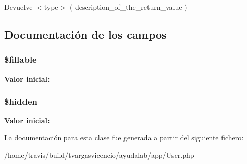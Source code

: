 \begin{DoxyReturn}{\-Devuelve}
$<$type$>$ ( description\-\_\-of\-\_\-the\-\_\-return\-\_\-value ) 
\end{DoxyReturn}


\subsection{\-Documentación de los campos}
\hypertarget{class_app_1_1_user_a6a90e74ccdf5efd70d51d10c906f8e32}{
\subsubsection[{\$fillable}]{\setlength{\rightskip}{0pt plus 5cm}\$fillable}}\label{class_app_1_1_user_a6a90e74ccdf5efd70d51d10c906f8e32}
{\bfseries \-Valor inicial\-:}
\begin{DoxyCode}
\end{DoxyCode}
\hypertarget{class_app_1_1_user_a4a374564d2858d8ae869a8fb890aad56}{
\subsubsection[{\$hidden}]{\setlength{\rightskip}{0pt plus 5cm}\$hidden}}\label{class_app_1_1_user_a4a374564d2858d8ae869a8fb890aad56}
{\bfseries \-Valor inicial\-:}
\begin{DoxyCode}
\end{DoxyCode}


\-La documentación para esta clase fue generada a partir del siguiente fichero\-:\begin{DoxyCompactItemize}
\item 
/home/travis/build/tvargasvicencio/ayudalab/app/\-User.\-php\end{DoxyCompactItemize}
